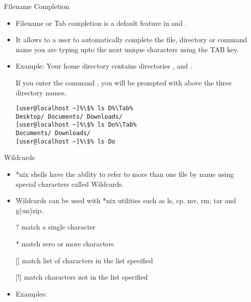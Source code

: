 \documentclass[10pt,t]{beamer}
\begin{document}
\begin{frame}[fragile]{Filename Completion}
  \begin{itemize}
    \item Filename or Tab completion is a default feature in  and .
    \item It allows to a user to automatically complete the file, directory or command name you are typing upto the next unique characters using the TAB key.
    \item Example: Your home directory contains directories ,  and .
    \item[] If you enter the command , you will be prompted with above the three directory names.
      \begin{lstlisting}[basicstyle=\color{lubrown}\bfseries\scriptsize\ttfamily,escapechar=\%]
[user@localhost ~]%\$% ls D%\Tab%
Desktop/ Documents/ Downloads/
[user@localhost ~]%\$% ls Do%\Tab%
Documents/ Downloads/
[user@localhost ~]%\$% ls Do
      \end{lstlisting}
  \end{itemize}
\end{frame}

\begin{frame}{Wildcards}
  \begin{itemize}
    \item *nix shells have the ability to refer to more than one file by name using special characters called Wildcards.
    \item Wildcards can be used with *nix utilities such as ls, cp, mv, rm, tar and g(un)zip.
    \item[?] match a single character
    \item[*] match zero or more characters
    \item[{[\quad]}] match list of characters in the list specified
    \item[{[!\quad]}] match characters not in the list specified
    \item Examples:
  \end{itemize}
\end{frame}
\end{document}
